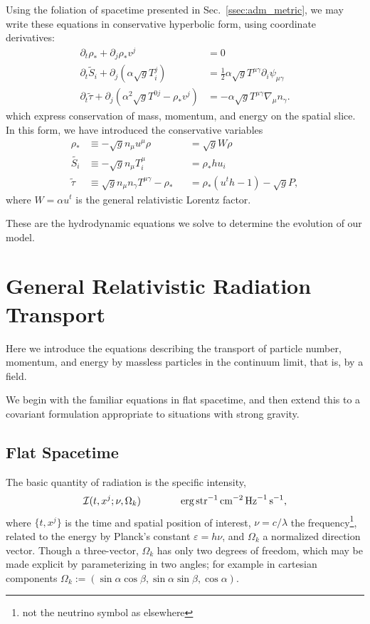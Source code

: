 Using the foliation of spacetime presented in Sec.~\ref{ssec:adm_metric}, we may
write these equations in conservative hyperbolic form,
using coordinate derivatives:
\begin{align}
  \label{eqn:adm_hydro_mass}
  \partial_t \rho_* + \partial_j \rho_* v^j &= 0 \\
  \label{eqn:adm_hydro_mom}
  \partial_t \tilde{S}_i + \partial_j(\alpha\sqrt{g}T^j_i) &=
  \frac{1}{2}\alpha\sqrt{g}T^{\mu\gamma}\partial_i\psi_{\mu\gamma} \\
  \label{eqn:adm_hydro_ener}
  \partial_t \tilde{\tau} + \partial_j(\alpha^2\sqrt{g}T^{0j}-\rho_*v^j) &=
  -\alpha\sqrt{g}T^{\mu\gamma}\nabla_\mu n_\gamma.
\end{align}
which express conservation of mass, momentum, and energy on the spatial slice.
In this form, we have introduced the conservative variables
\begin{align}
  \label{eqn:rhostar}
  \rho_*       &\equiv -\sqrt{g} n_\mu u^\mu \rho &&= \sqrt{g}W\rho \\
  \label{eqn:tildeS}
  \tilde{S_i}  &\equiv -\sqrt{g} n_\mu T^\mu_i    &&= \rho_* h u_i \\
  \label{eqn:tildetau}
  \tilde{\tau} &\equiv  \sqrt{g} n_\mu n_\gamma T^{\mu\gamma} - \rho_*
  &&= \rho_*(u^t h-1)-\sqrt{g}P,
\end{align}
where $W=\alpha u^t$ is the general relativistic Lorentz factor.

These are the hydrodynamic equations we solve to determine the evolution of
our model.

\section{General Relativistic Radiation Transport}
\label{sec:rad_transport}
Here we introduce the equations describing the transport of particle number,
momentum, and energy by massless particles in the continuum limit, that is,
by a field.

We begin with the familiar equations in flat spacetime, and then extend this
to a covariant formulation appropriate to situations with strong gravity.

\subsection{Flat Spacetime}
The basic quantity of radiation is the specific intensity,
\begin{equation}
  \mathcal{I}(t,x^j;\nu,\Omega_k) \qquad \qquad
  {\rm erg}\,{\rm str}^{-1}\,{\rm cm}^{-2}\,{\rm Hz}^{-1}\,{\rm s}^{-1}, \nonumber
\end{equation}
where $\{t,x^j\}$ is the time and spatial position of interest,
$\nu=c/\lambda$ the frequency\footnote{not the neutrino symbol as elsewhere},
related to the energy by Planck's constant $\varepsilon=h\nu$, and
$\Omega_k$ a normalized direction vector. Though a three-vector, $\Omega_k$
has only two degrees of freedom, which may be made explicit by parameterizing
in two angles; for example in cartesian components
$\Omega_k:=(\sin\alpha\cos\beta,\sin\alpha\sin\beta,\cos\alpha)$.

